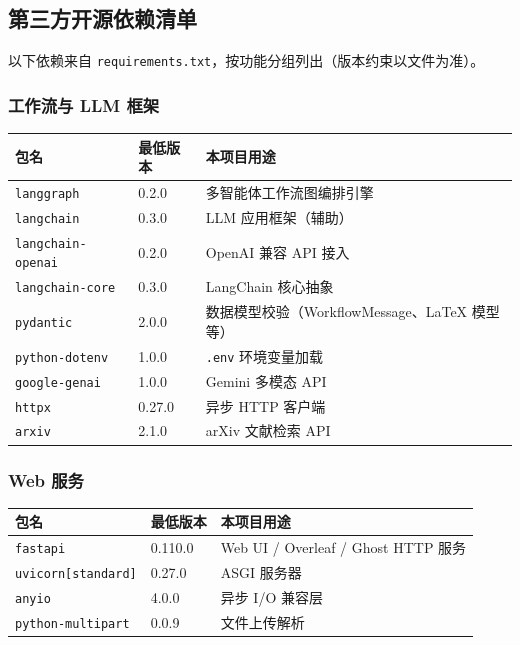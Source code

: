 \subsection{第三方开源依赖清单}

以下依赖来自 \texttt{requirements.txt}，按功能分组列出（版本约束以文件为准）。

\subsubsection{工作流与 LLM 框架}

\begin{longtable}{@{}p{}p{}p{}@{}}
\toprule
\textbf{包名} & \textbf{最低版本} & \textbf{本项目用途} \\
\midrule
\endhead
\texttt{langgraph} & 0.2.0 & 多智能体工作流图编排引擎 \\
\texttt{langchain} & 0.3.0 & LLM 应用框架（辅助） \\
\texttt{langchain-openai} & 0.2.0 & OpenAI 兼容 API 接入 \\
\texttt{langchain-core} & 0.3.0 & LangChain 核心抽象 \\
\texttt{pydantic} & 2.0.0 & 数据模型校验（WorkflowMessage、LaTeX 模型等） \\
\texttt{python-dotenv} & 1.0.0 & \texttt{.env} 环境变量加载 \\
\texttt{google-genai} & 1.0.0 & Gemini 多模态 API \\
\texttt{httpx} & 0.27.0 & 异步 HTTP 客户端 \\
\texttt{arxiv} & 2.1.0 & arXiv 文献检索 API \\
\bottomrule
\end{longtable}

\subsubsection{Web 服务}

\begin{longtable}{@{}p{}p{}p{}@{}}
\toprule
\textbf{包名} & \textbf{最低版本} & \textbf{本项目用途} \\
\midrule
\endhead
\texttt{fastapi} & 0.110.0 & Web UI / Overleaf / Ghost HTTP 服务 \\
\texttt{uvicorn[standard]} & 0.27.0 & ASGI 服务器 \\
\texttt{anyio} & 4.0.0 & 异步 I/O 兼容层 \\
\texttt{python-multipart} & 0.0.9 & 文件上传解析 \\
\bottomrule
\end{longtable}

